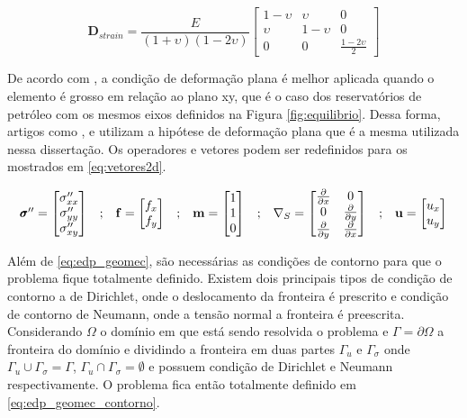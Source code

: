 \begin{equation} \label{eq:elasticplanestrain}
\mathbf{D}_{strain} = \frac{E}{(1+\upsilon)(1-2\upsilon)}
\begin{bmatrix}
 1-\upsilon & \upsilon    &  0 \\
 \upsilon   &  1-\upsilon &  0 \\
 0& 0 & \frac{1-2\upsilon}{2}
\end{bmatrix}
\end{equation}

De acordo com \citet{jacob}, a condição de deformação plana é melhor aplicada quando o elemento é grosso em relação ao plano xy, que é o caso dos reservatórios de petróleo com os mesmos eixos definidos na Figura \ref{fig:equilibrio}. Dessa forma, artigos como \cite{casteletto}, \cite{planeStrainProblems} e \cite{irina} utilizam a hipótese de deformação plana que é a mesma utilizada nessa dissertação. Os operadores e vetores podem ser redefinidos para os mostrados em \eqref{eq:vetores2d}.

\begin{equation}
\label{eq:vetores2d}
\begin{matrix}
\pmb{\sigma}^{\prime\prime} = \begin{bmatrix}
\sigma^{\prime\prime}_{xx}
\\
\sigma^{\prime\prime}_{yy}
\\
\sigma^{\prime\prime}_{xy}
\end{bmatrix}
&

;

&

\mathbf{f} = \begin{bmatrix}
f_{x}
\\
f_{y}
\end{bmatrix}
&
;
&

\mathbf{m} = \begin{bmatrix} 1 \\ 1 \\ 0\end{bmatrix}

&
;

&
\nabla_S = \begin{bmatrix} \frac{\partial { }}{\partial x} & 0 \\ 0 & \frac{\partial { }}{\partial y} \\ \frac{\partial { }}{\partial y} & \frac{\partial { }}{\partial x} \\ \end{bmatrix}

&
;

&

\mathbf{u} = \begin{bmatrix}
u_x
\\
u_y
\end{bmatrix}

\end{matrix}
\end{equation}

Além de \eqref{eq:edp_geomec}, são necessárias as condições de contorno para que o problema fique totalmente definido. Existem dois principais tipos de condição de contorno a de Dirichlet, onde o deslocamento da fronteira é prescrito e condição de contorno de Neumann, onde a tensão normal a fronteira é preescrita. Considerando $\Omega$ o domínio em que está sendo resolvida o problema e $\Gamma = \partial \Omega$ a fronteira do domínio e dividindo a fronteira em duas partes $\Gamma_u$ e $\Gamma_{\sigma}$ onde $\Gamma_u \cup \Gamma_{\sigma} = \Gamma$, $\Gamma_u \cap \Gamma_{\sigma} = \emptyset $ e possuem condição de Dirichlet e Neumann respectivamente. O problema fica então totalmente definido em \eqref{eq:edp_geomec_contorno}.


